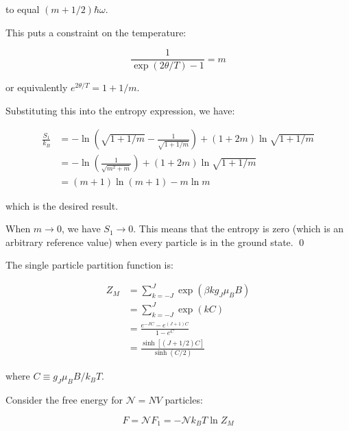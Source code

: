 \documentclass[12pt]{article}
\begin{document}
to equal $(m + 1/2)\hbar \omega$.

This puts a constraint on the temperature:

\begin{equation}
    \frac{1}{\exp\left( 2\theta / T \right) - 1} = m
\end{equation}

or equivalently $e^{2\theta / T} = 1 + 1/m$.

Substituting this into the entropy expression, we have:

\begin{equation}
    \begin{split}
        \frac{S_{1}}{k_{B}} &= -\ln{\left( \sqrt{1 + 1/m} - \frac{1}{\sqrt{1 + 1/m}} \right)} + (1 + 2m) \ln{\sqrt{1 + 1/m}} \\
        &= -\ln{\left( \frac{1}{\sqrt{m^{2} + m}} \right)} + (1 + 2m) \ln{\sqrt{1 + 1/m}} \\
        &= (m + 1) \ln{(m + 1)} - m \ln{m}
    \end{split}
\end{equation}

which is the desired result.

When $m \to 0$, we have $S_{1} \to 0$. This means that the entropy is zero (which is an arbitrary reference value) when every particle is in the ground state.
\qed



The single particle partition function is:

\begin{equation}
    \begin{split}
        Z_{M} &= \sum_{k = -J}^{J} \exp \left( \beta k g_{J} \mu_{B} B \right) \\
        &= \sum_{k = -J}^{J} \exp \left( k C \right) \\
        &= \frac{e^{-J C} - e^{(J+1)C}}{1 - e^{C}} \\
        &= \frac{\sinh{\left[ ( J + 1/2 ) C \right]}}{\sinh{\left( C/2 \right)}}
    \end{split}
\end{equation}

where $C \equiv g_{J} \mu_{B} B / k_{B} T$.

Consider the free energy for $\mathcal{N} = NV$ particles:

\begin{equation}
    F = \mathcal{N} F_{1} = -\mathcal{N} k_{B} T \ln{Z_{M}}
\end{equation}
\end{document}
